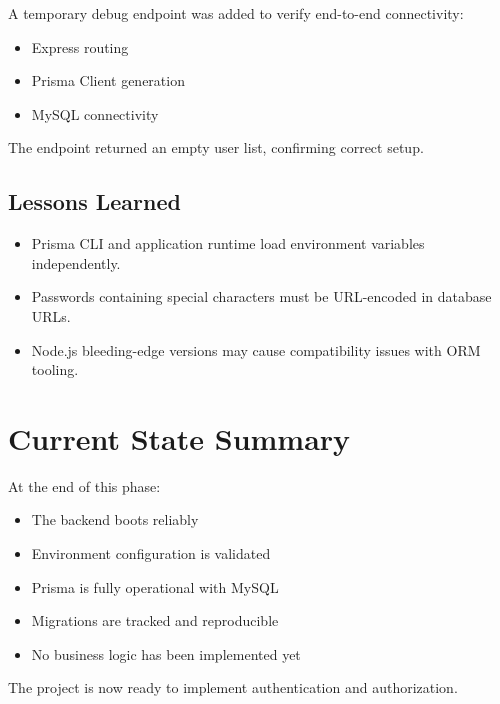 \documentclass[11pt,a4paper]{article}
\begin{document}
    A temporary debug endpoint was added to verify end-to-end connectivity:

    \begin{itemize}
        \item Express routing
        \item Prisma Client generation
        \item MySQL connectivity
    \end{itemize}

    The endpoint returned an empty user list, confirming correct setup.

    \subsection{Lessons Learned}

    \begin{itemize}
        \item Prisma CLI and application runtime load environment variables independently.
        \item Passwords containing special characters must be URL-encoded in database URLs.
        \item Node.js bleeding-edge versions may cause compatibility issues with ORM tooling.
    \end{itemize}

    \section{Current State Summary}

    At the end of this phase:
    \begin{itemize}
        \item The backend boots reliably
        \item Environment configuration is validated
        \item Prisma is fully operational with MySQL
        \item Migrations are tracked and reproducible
        \item No business logic has been implemented yet
    \end{itemize}

    The project is now ready to implement authentication and authorization.
\end{document}
